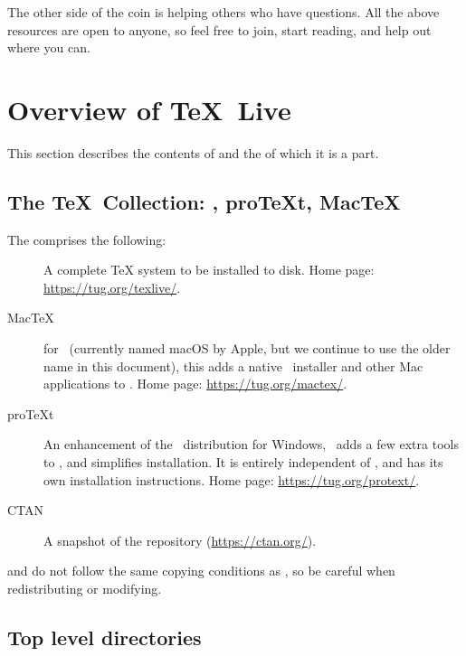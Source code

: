\documentclass{article}
\begin{document}
The other side of the coin is helping others who have questions.  All
the above resources are open to anyone, so feel free to join, start
reading, and help out where you can.


\section{Overview of \protect\TeX\protect\ Live}
\label{sec:overview-tl}

This section describes the contents of \TL{} and the \TK{} of which it
is a part.

\subsection{The \protect\TeX\protect\ Collection: \protect\TL,
           pro\protect\TeX{}t, Mac\protect\TeX}
\label{sec:tl-coll-dists}

The \TK{} \DVD{} comprises the following:

\begin{description}

\item [\TL] A complete \TeX{} system to be installed to disk.  Home
page: \url{https://tug.org/texlive/}.

\item [Mac\TeX] for \MacOSX\ (currently named macOS by Apple, but we
continue to use the older name in this document), this adds a native
\MacOSX\ installer and other Mac applications to \TL{}. Home page:
\url{https://tug.org/mactex/}.

\item [pro\TeX{}t] An enhancement of the \MIKTEX\ distribution for Windows,
\ProTeXt\ adds a few extra tools to \MIKTEX, and simplifies
installation.  It is entirely independent of \TL{}, and has its own
installation instructions.  Home page:
\url{https://tug.org/protext/}.

\item [CTAN] A snapshot of the \CTAN{} repository (\url{https://ctan.org/}).

\end{description}

\CTAN{} and  do not follow the same copying conditions
as \TL{}, so be careful when redistributing or modifying.


\subsection{Top level \protect\TL{} directories}
\label{sec:tld}
\end{document}
